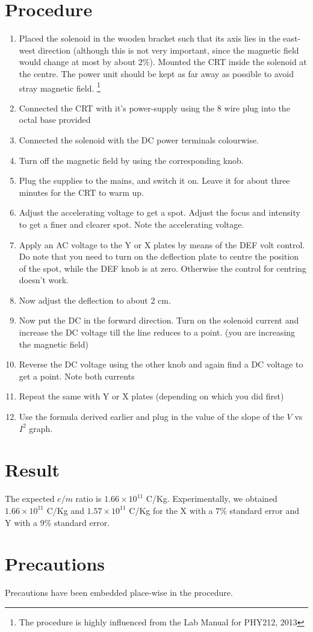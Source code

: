 \section{Procedure}
	
	\begin{enumerate}
		\item Placed the solenoid in the wooden bracket such that its axis lies in the east-west direction (although this is not very important, since the magnetic field would change at most by about $2\%$). Mounted the CRT inside the solenoid at the centre. The power unit should be kept as far away as possible to avoid stray magnetic field. \footnote {The procedure is highly influenced from the Lab Manual for PHY212, 2013}
		\item Connected the CRT with it's power-supply using the 8 wire plug into the octal base provided
		\item Connected the solenoid with the DC power terminals colourwise.
		\item Turn off the magnetic field by using the corresponding knob.
		\item Plug the supplies to the mains, and switch it on. Leave it for about three minutes for the CRT to warm up.
		\item Adjust the accelerating voltage to get a spot. Adjust the focus and intensity to get a finer and clearer spot. Note the accelerating voltage. 
		\item Apply an AC voltage to the Y or X plates by means of the DEF volt control. Do note that you need to turn on the deflection plate to centre the position of the spot, while the DEF knob is at zero. Otherwise the control for centring doesn't work.
		\item Now adjust the deflection to about 2 cm.
		\item Now put the DC in the forward direction. Turn on the solenoid current and increase the DC voltage till the line reduces to a point. (you are increasing the magnetic field)
		\item Reverse the DC voltage using the other knob and again find a DC voltage to get a point. Note both currents
		\item Repeat the same with Y or X plates (depending on which you did first)
		\item Use the formula derived earlier and plug in the value of the slope of the $V$ vs $I^2$ graph.
	\end{enumerate}

\section{Result}
	The expected $e/m$ ratio is $1.66 \times 10^{11}$ C/Kg. Experimentally, we obtained $1.66\times 10^{11}$ C/Kg and $1.57 \times 10^{11}$ C/Kg for the X with a $7\%$ standard error and Y with a $9\%$ standard error.

\section{Precautions}
	Precautions have been embedded place-wise in the procedure.